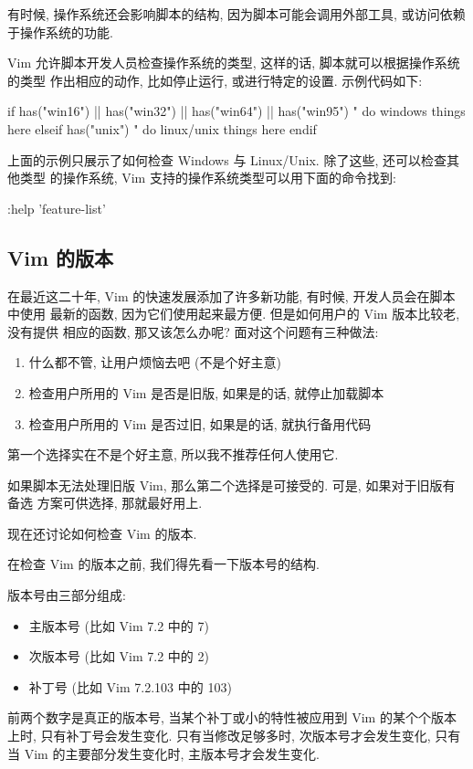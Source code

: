 有时候, 操作系统还会影响脚本的结构, 因为脚本可能会调用外部工具, 或访问依赖
于操作系统的功能.

Vim 允许脚本开发人员检查操作系统的类型, 这样的话, 脚本就可以根据操作系统的类型
作出相应的动作, 比如停止运行, 或进行特定的设置. 示例代码如下:
\begin{vimcode}
if has("win16") || has("win32") || has("win64") || has("win95")
	" do windows things here
elseif has("unix")
	" do linux/unix things here
endif
\end{vimcode}
上面的示例只展示了如何检查 Windows 与 Linux/Unix. 除了这些, 还可以检查其他类型
的操作系统, Vim 支持的操作系统类型可以用下面的命令找到:
\begin{vimcode}
:help 'feature-list'
\end{vimcode}

\subsection{Vim 的版本}
\label{subsec:which_version_of_vim}

在最近这二十年, Vim 的快速发展添加了许多新功能, 有时候, 开发人员会在脚本中使用
最新的函数, 因为它们使用起来最方便. 但是如何用户的 Vim 版本比较老, 没有提供
相应的函数, 那又该怎么办呢?
面对这个问题有三种做法:
\begin{enumerate}
    \item 什么都不管, 让用户烦恼去吧 (不是个好主意)
    \item 检查用户所用的 Vim 是否是旧版, 如果是的话, 就停止加载脚本
    \item 检查用户所用的 Vim 是否过旧, 如果是的话, 就执行备用代码
\end{enumerate}

第一个选择实在不是个好主意, 所以我不推荐任何人使用它.

如果脚本无法处理旧版 Vim, 那么第二个选择是可接受的. 可是, 如果对于旧版有备选
方案可供选择, 那就最好用上.

现在还讨论如何检查 Vim 的版本.

在检查 Vim 的版本之前, 我们得先看一下版本号的结构.

版本号由三部分组成:
\begin{itemize}
    \item 主版本号 (比如 Vim 7.2 中的 7)
    \item 次版本号 (比如 Vim 7.2 中的 2)
    \item 补丁号 (比如 Vim 7.2.103 中的 103)
\end{itemize}
前两个数字是真正的版本号, 当某个补丁或小的特性被应用到 Vim 的某个个版本上时,
只有补丁号会发生变化. 只有当修改足够多时, 次版本号才会发生变化, 只有当 Vim
的主要部分发生变化时, 主版本号才会发生变化.

